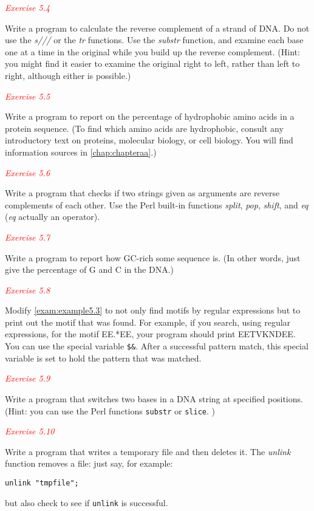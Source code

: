 \textcolor{red}{\textit{Exercise 5.4}}
\begin{adjustwidth}{2em}{}
Write a program to calculate the reverse complement of a strand of DNA. Do not use the \textit{s///} or the \textit{tr} functions. Use the \textit{substr} function, and examine each base one at a time in the original while you build up the reverse complement. (Hint: you might find it easier to examine the original right to left, rather than left to right, although either is possible.) 
\end{adjustwidth}

\textcolor{red}{\textit{Exercise 5.5}}
\begin{adjustwidth}{2em}{}
Write a program to report on the percentage of hydrophobic amino acids in a protein sequence. (To find which amino acids are hydrophobic, consult any introductory text on proteins, molecular biology, or cell biology. You will find information sources in \autoref{chap:chapteraa}.) 
\end{adjustwidth}

\textcolor{red}{\textit{Exercise 5.6}}
\begin{adjustwidth}{2em}{}
Write a program that checks if two strings given as arguments are reverse complements of each other. Use the Perl built-in functions \textit{split}, \textit{pop}, \textit{shift}, and \textit{eq} (\textit{eq} actually an operator). 
\end{adjustwidth}

\textcolor{red}{\textit{Exercise 5.7}}
\begin{adjustwidth}{2em}{}
Write a program to report how GC-rich some sequence is. (In other words, just give the percentage of G and C in the DNA.)
\end{adjustwidth}

\textcolor{red}{\textit{Exercise 5.8}}
\begin{adjustwidth}{2em}{}
Modify \autoref{exam:example5.3} to not only find motifs by regular expressions but to print out the motif that was found. For example, if you search, using regular expressions, for the motif EE.*EE, your program should print EETVKNDEE. You can use the special variable \verb|$&|. After a successful pattern match, this special variable is set to hold the pattern that was matched. 
\end{adjustwidth}

\textcolor{red}{\textit{Exercise 5.9}}
\begin{adjustwidth}{2em}{}
Write a program that switches two bases in a DNA string at specified positions. (Hint: you can use the Perl functions \verb|substr| or \verb|slice|. )
\end{adjustwidth}

\textcolor{red}{\textit{Exercise 5.10}}
\begin{adjustwidth}{2em}{}
Write a program that writes a temporary file and then deletes it. The \textit{unlink} function removes a file: just say, for example:
\begin{lstlisting}
unlink "tmpfile";
\end{lstlisting}
but also check to see if \verb|unlink| is successful.
\end{adjustwidth}
